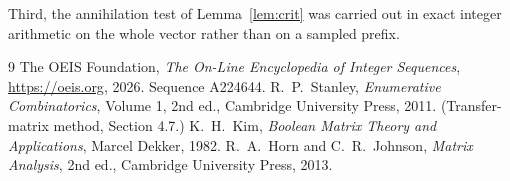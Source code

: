 \documentclass[11pt,a4paper]{article}
\theoremstyle{plain}
\theoremstyle{definition}
\begin{document}
Third, the annihilation test of Lemma~\ref{lem:crit} was carried out in exact integer
arithmetic on the whole vector rather than on a sampled prefix.

\begin{thebibliography}{9}
 The OEIS Foundation, \emph{The On-Line Encyclopedia of Integer
Sequences}, \url{https://oeis.org}, 2026. Sequence A224644.
 R.~P.~Stanley, \emph{Enumerative Combinatorics}, Volume 1, 2nd ed.,
Cambridge University Press, 2011. (Transfer-matrix method, Section 4.7.)
 K.~H.~Kim, \emph{Boolean Matrix Theory and Applications}, Marcel Dekker,
1982.
 R.~A.~Horn and C.~R.~Johnson, \emph{Matrix Analysis}, 2nd ed., Cambridge
University Press, 2013.
\end{thebibliography}
\end{document}
